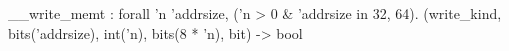 __write_memt : forall 'n 'addrsize, ('n > 0 & 'addrsize in {32, 64}).
  (write_kind, bits('addrsize), int('n), bits(8 * 'n), bit) -> bool